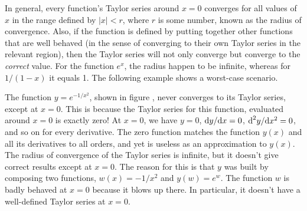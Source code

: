 In general, every function's Taylor series around $x=0$ converges for all values of $x$ in the range
defined by $|x|<r$, where $r$ is some number, known as the radius of convergence.
Also, if the function is defined by putting together other functions that are well behaved (in the sense of
converging to their own Taylor series in the relevant region), then the Taylor series will not only converge
but converge to the \emph{correct} value.
For the function $e^x$, the radius
happen to be infinite, whereas for $1/(1-x)$ it equals 1. The following example shows a worst-case
scenario.


\begin{eg}
The function $y=e^{-1/x^2}$, shown in figure , never converges to its Taylor series, except at $x=0$.
This is because the Taylor series for this function, evaluated around $x=0$ is exactly zero! At $x=0$, we have
$y=0$, $\textup{d} y/\textup{d} x=0$, $\textup{d}^2 y/\textup{d} x^2=0$, and so on for every derivative. The zero function matches the function
$y(x)$ and all its derivatives to all orders, and yet is useless as an approximation to $y(x)$. The radius of convergence
of the Taylor series is infinite, but it doesn't give correct results except at $x=0$. The reason for this is that
$y$ was built by composing two functions, $w(x)=-1/x^2$ and $y(w)=e^w$. The function $w$ is badly behaved at $x=0$
because it blows up there. In particular, it doesn't have a well-defined Taylor series at $x=0$.
\end{eg}

